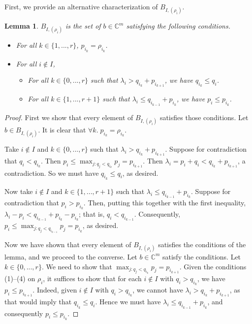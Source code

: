 \documentclass[12pt,psamsfonts]{article}
\newtheorem{lemma}[theorem]{Lemma}
\begin{document}
\par First, we provide an alternative characterization of \(B_{I, (\rho_i)}\).
\begin{lemma}\label{alternative_bs_one}
    \(B_{I, (\rho_i)}\) is the set of \(b \in \mathbb{C}^m\) satisfying the following conditions.
    \begin{itemize}
        \item For all \(k \in \{1, ..., r\}\), \(p_{i_k} = \rho_{i_k}\).
        \item For all \(i \notin I\),
        \begin{itemize}
            \item For all \(k \in \{0, ..., r\}\) such that \(\lambda_i > q_{i_k} + p_{i_{k + 1}}\), we have \(q_{i_k} \leq q_i\).
            \item For all \(k \in \{1, ..., r + 1\}\) such that \(\lambda_i \leq q_{i_{k - 1}} + p_{i_k}\), we have \(p_i \leq p_{i_k}\).
        \end{itemize}
    \end{itemize}
\end{lemma}
\begin{proof}
    First we show that every element of \(B_{I, (\rho_i)}\) satisfies those conditions.
    Let \(b \in B_{I, (\rho_i)}\).
    It is clear that \(\forall k. \; p_{i_k} = \rho_{i_k}\).
    \par Take \(i \notin I\) and \(k \in \{0, ..., r\}\) such that \(\lambda_i > q_{i_k} + p_{i_{k + 1}}\).
    Suppose for contradiction that \(q_i < q_{i_k}\).
    Then \(p_i \leq \max_{j : q_j < q_{i_k}} p_j = p_{i_{k + 1}}\).
    Then \(\lambda_i = p_i + q_i < q_{i_k} + p_{i_{k + 1}}\), a contradiction.
    So we must have \(q_{i_k} \leq q_i\), as desired.
    \par Now take \(i \notin I\) and \(k \in \{1, ..., r + 1\}\) such that \(\lambda_i \leq q_{i_{k - 1}} + p_{i_k}\).
    Suppose for contradiction that \(p_i > p_{i_k}\).
    Then, putting this together with the first inequality, \(\lambda_i - p_i < q_{i_{k - 1}} + p_{i_k} - p_{i_k}\); that is, \(q_i < q_{i_{k - 1}}\).
    Consequently, \(p_i \leq \max_{j : q_j < q_{i_{k - 1}}} p_j = p_{i_k}\), as desired.
    \par Now we have shown that every element of \(B_{I, (\rho_i)}\) satisfies the conditions of the lemma, and we proceed to the converse.
    Let \(b \in \mathbb{C}^m\) satisfy the conditions.
    Let \(k \in \{0, ..., r\}\).
    We need to show that \(\max_{j : q_j < q_{i_k}} p_j = p_{i_{k + 1}}\).
    Given the conditions (1)--(4) on \(\rho_i\), it suffices to show that for each \(i \notin I\) with \(q_i > q_{i_k}\), we have \(p_i \leq p_{i_{k + 1}}\).
    Indeed, given \(i \notin I\) with \(q_i > q_{i_k}\), we cannot have \(\lambda_i > q_{i_k} + p_{i_{k + 1}}\), as that would imply that \(q_{i_k} \leq q_i\).
    Hence we must have \(\lambda_i \leq q_{i_{k - 1}} + p_{i_k}\), and consequently \(p_i \leq p_{i_k}\).
\end{proof}
\end{document}
